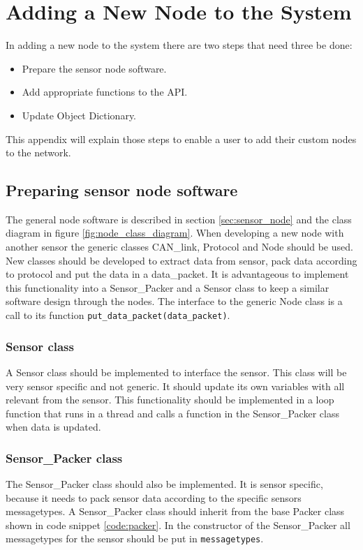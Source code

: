 \section{Adding a New Node to the System}
\label{app:addnode}
In adding a new node to the system there are two steps that need three be done:
\begin{itemize}
	\item Prepare the sensor node software.
	\item Add appropriate functions to the API.
	\item Update Object Dictionary.
\end{itemize}
This appendix will explain those steps to enable a user to add their custom nodes to the network.

\subsection{Preparing sensor node software}\label{sec:node_implementation_guide}
The general node software is described in section \ref{sec:sensor_node} and the class diagram in figure \ref{fig:node_class_diagram}.
When developing a new node with another sensor the generic classes CAN\_link, Protocol and Node should be used. 
New classes should be developed to extract data from sensor, pack data according to protocol and put the data in a data\_packet.
It is advantageous to implement this functionality into a Sensor\_Packer and a Sensor class to keep a similar software design through the nodes.
The interface to the generic Node class is a call to its function \texttt{put\_data\_packet(data\_packet)}.

\subsubsection*{Sensor class}
A Sensor class should be implemented to interface the sensor. 
This class will be very sensor specific and not generic. 
It should update its own variables with all relevant from the sensor.
This functionality should be implemented in a loop function that runs in a thread and calls a function in the Sensor\_Packer class when data is updated.


\subsubsection*{Sensor\_Packer class}
The Sensor\_Packer class should also be implemented.
It is sensor specific, because it needs to pack sensor data according to the specific sensors messagetypes.
A Sensor\_Packer class should inherit from the base Packer class shown in code snippet \ref{code:packer}.
In the constructor of the Sensor\_Packer all messagetypes for the sensor should be put in \texttt{messagetypes}.


